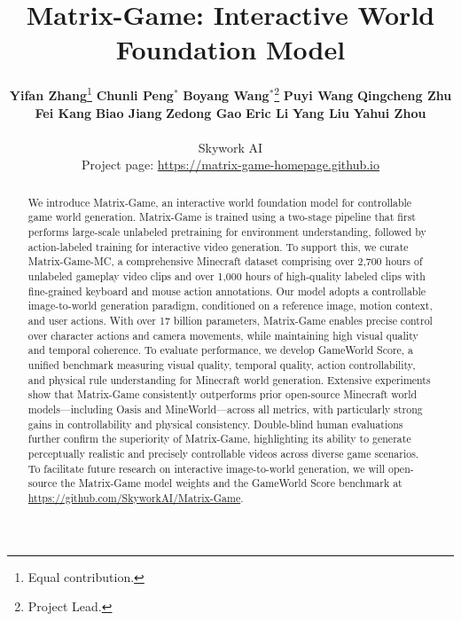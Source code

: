 \documentclass{article}
\title{Matrix-Game: Interactive World Foundation Model}
\author{%
  \textbf{Yifan Zhang}\thanks{Equal contribution.}\quad
  \textbf{Chunli Peng}$^{*}$\quad
  \textbf{Boyang Wang}$^{*}$\thanks{Project Lead.}\quad
  \textbf{Puyi Wang}\quad 
  \textbf{Qingcheng Zhu} \\
  \textbf{Fei Kang}\quad
  \textbf{Biao Jiang}\quad
  \textbf{Zedong Gao}\quad
  \textbf{Eric Li}\quad
  \textbf{Yang Liu}\quad
  \textbf{Yahui Zhou} \\
  \\
  Skywork AI \\
  Project page: \url{https://matrix-game-homepage.github.io}
}
\begin{document}
\maketitle




\begin{abstract}
We introduce Matrix-Game, an interactive world foundation model for controllable game world generation. Matrix-Game is trained using a two-stage pipeline that first performs large-scale unlabeled pretraining for environment understanding, followed by action-labeled training for interactive video generation. To support this, we curate Matrix-Game-MC, a comprehensive Minecraft dataset comprising over 2,700 hours of unlabeled gameplay video clips and over 1,000 hours of high-quality labeled clips with fine-grained keyboard and mouse action annotations. Our model adopts a controllable image-to-world generation paradigm, conditioned on a reference image, motion context, and user actions. With over 17 billion parameters, Matrix-Game enables precise control over character actions and camera movements, while maintaining high visual quality and temporal coherence. To evaluate performance, we develop  GameWorld Score, a unified benchmark measuring visual quality, temporal quality, action controllability, and physical rule understanding for Minecraft world generation. Extensive experiments show that Matrix-Game consistently outperforms prior open-source Minecraft world models—including Oasis and MineWorld—across all metrics, with particularly strong gains in controllability and physical consistency. Double-blind human evaluations further confirm the superiority of Matrix-Game, highlighting  its ability to generate perceptually realistic and precisely controllable videos across diverse game scenarios. To facilitate future research on interactive image-to-world generation, we will open-source the Matrix-Game model weights and the GameWorld Score benchmark at \url{https://github.com/SkyworkAI/Matrix-Game}.

\end{abstract}
 
\end{document}
